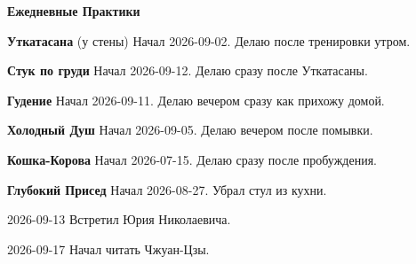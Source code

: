 \nopagenumbers
\centerline{\bf Ежедневные Практики}
\bigskip
\item{\bf Уткатасана} (у стены) Начал 2026-09-02.
Делаю после тренировки утром.
\item{\bf Стук по груди} Начал 2026-09-12. Делаю
сразу после Уткатасаны.
\item{\bf Гудение} Начал 2026-09-11. Делаю вечером сразу
как прихожу домой.
\item{\bf Холодный Душ} Начал 2026-09-05. Делаю
вечером после помывки.
\item{\bf Кошка-Корова} Начал 2026-07-15. Делаю сразу
после пробуждения.
\item{\bf Глубокий Присед} Начал 2026-08-27.
Убрал стул из кухни.
\item{2026-09-13} Встретил Юрия Николаевича.
\item{2026-09-17} Начал читать Чжуан-Цзы.
\bye
